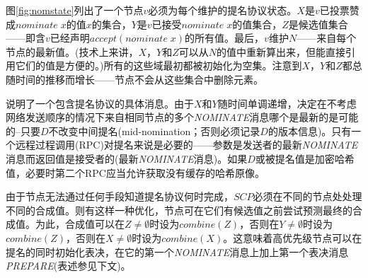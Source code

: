 
{图\ref{fig:nomstate}}列出了一个节点$v$必须为每个{\slot}维护的提名协议状态。$X$是$v$已投票赞成$nominate\;x$的值$x$的集合，$Y$是$v$已接受$nominate\;x$的值集合，$Z$是候选值集合——即含$v${\quorum}已经声明$accept(nominate\;x)$的所有值。最后，$v$维护$N$——来自每个节点的最新值。(技术上来讲，$X$，$Y$和$Z$可以从$N$的值中重新算出来，但能直接引用它们的值是方便的。)所有的这些域最初都被初始化为空集。注意到$X$，$Y$和$Z$都总随时间的推移而增长——节点不会从这些集合中删除元素。

说明了一个包含提名协议的具体消息。由于$X$和$Y$随时间单调递增，决定在不考虑网络发送顺序的情况下来自相同节点的多个\textsl{NOMINATE}消息哪个是最新的是可能的--只要$D$不改变中间提名(mid-nomination；否则必须记录$D$的版本信息)。只有一个远程过程调用(RPC)对提名来说是必要的——参数是发送者的最新\textsl{NOMINATE}消息而返回值是接受者的(最新\textsl{NOMINATE}消息{})。如果$D$或被提名值是加密哈希值，必要时第二个RPC应当允许获取没有缓存的哈希原像。

由于节点无法通过任何手段知道提名协议何时完成，$SCP$必须在不同的节点处处理不同的合成值。则有这样一种优化，节点可在它们有候选值之前尝试预测最终的合成值。为此，合成值可以在$Z\neq \emptyset$时设为$combine(Z)$，否则在$Y\neq \emptyset$时设为$combine(Z)$，否则在$X\neq \emptyset$时设为$combine(X)$。这意味着高优先级节点可以在提名的同时初始化表决，在它的第一个\textsl{NOMINATE}消息上加上第一个表决消息\textsl{PREPARE}(表述参见下文)。